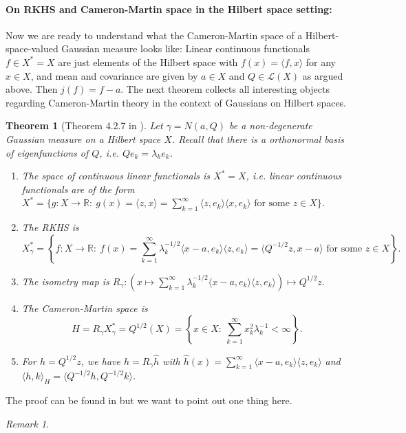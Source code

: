 \documentclass{scrartcl}
\newtheorem{theorem}{Theorem}
\theoremstyle{definition}
\theoremstyle{remark}
\newtheorem{remark}{Remark}
\newcommand{\R}{\mathbb R}
\begin{document}
{\paragraph{On RKHS and Cameron-Martin space in the Hilbert space setting: }
Now we are ready to understand what the Cameron-Martin space of a Hilbert-space-valued Gaussian measure looks like: Linear continuous functionals $f\in X^* = X$ are just elements of the Hilbert space with $f(x) = \langle f, x\rangle$ for any $x\in X$, and mean and covariance are given by $a\in X$ and $Q\in \mathcal L(X)$ as argued above. Then $j(f) = f-a$. The next theorem collects all interesting objects regarding Cameron-Martin theory in the context of Gaussians on Hilbert spaces.
\begin{theorem}[Theorem 4.2.7 in \cite{Lunardi}]\label{thm:Hilbert}
Let $\gamma = N(a,Q)$ be a non-degenerate Gaussian measure on a Hilbert space $X$. Recall that there is a orthonormal basis of eigenfunctions of $Q$, i.e. $Qe_k = \lambda_k e_k$.
\begin{enumerate}
\item The space of continuous linear functionals is $X^* = X$, i.e. linear continuous functionals are of the form $X^* = \{g:X\to\R:~ g(x) = \langle z,x\rangle = \sum_{k=1}^\infty \langle z, e_k\rangle \langle x, e_k\rangle \text{ for some $z\in X$}\}$.
\item The RKHS is 
\[X_\gamma^* = \left\{f: X\to \R:~ f(x) = \sum_{k=1}^\infty \lambda_k^{-1/2} \langle x-a, e_k\rangle \langle z, e_k\rangle = \langle Q^{-1/2}z,x-a\rangle \text{ for some $z\in X$}\right\}.\]
\item The isometry map is $R_\gamma: \left(x\mapsto \sum_{k=1}^\infty \lambda_k^{-1/2} \langle x-a, e_k\rangle \langle z, e_k\rangle\right) \mapsto Q^{1/2} z$.
\item The Cameron-Martin space is 
\[H = R_\gamma X_\gamma^* = Q^{1/2}(X) = \left\{x\in X:~ \sum_{k=1}^\infty x_k^2 \lambda_k^{-1}<\infty\right\}.\]
\item For $h = Q^{1/2}z$, we have $h = R_\gamma \hat h$ with $\hat h(x) = \sum_{k=1}^\infty \langle x-a, e_k\rangle \langle z, e_k\rangle$ and $\langle h, k\rangle_H = \langle Q^{-1/2} h, Q^{-1/2}k\rangle$.
\end{enumerate}
\end{theorem}
The proof can be found in \cite{Lunardi} but we want to point out one thing here.
\begin{remark}

\end{remark}}
\end{document}
